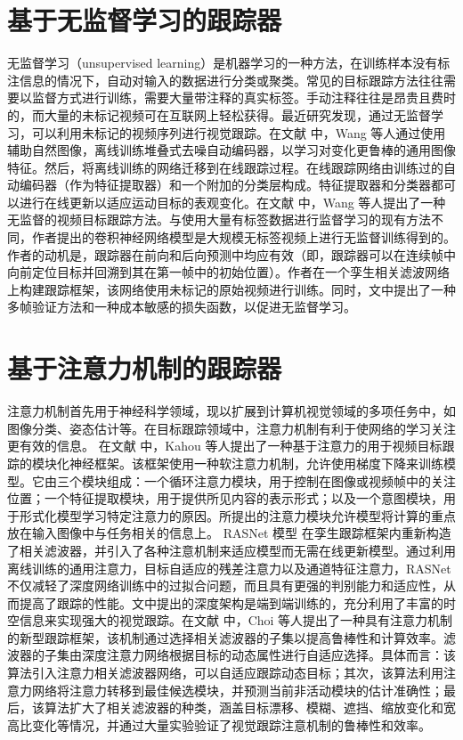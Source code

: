 \section{基于无监督学习的跟踪器}
无监督学习（unsupervised learning）是机器学习的一种方法，在训练样本没有标注信息的情况下，自动对输入的数据进行分类或聚类。常见的目标跟踪方法往往需要以监督方式进行训练，需要大量带注释的真实标签。手动注释往往是昂贵且费时的，而大量的未标记视频可在互联网上轻松获得。最近研究发现，通过无监督学习，可以利用未标记的视频序列进行视觉跟踪。在文献 \cite{wang2013learning} 中，Wang 等人通过使用辅助自然图像，离线训练堆叠式去噪自动编码器，以学习对变化更鲁棒的通用图像特征。然后，将离线训练的网络迁移到在线跟踪过程。在线跟踪网络由训练过的自动编码器（作为特征提取器）和一个附加的分类层构成。特征提取器和分类器都可以进行在线更新以适应运动目标的表观变化。在文献 \cite{wang2019unsupervised} 中，Wang 等人提出了一种无监督的视频目标跟踪方法。与使用大量有标签数据进行监督学习的现有方法不同，作者提出的卷积神经网络模型是大规模无标签视频上进行无监督训练得到的。作者的动机是，跟踪器在前向和后向预测中均应有效（即，跟踪器可以在连续帧中向前定位目标并回溯到其在第一帧中的初始位置）。作者在一个孪生相关滤波网络上构建跟踪框架，该网络使用未标记的原始视频进行训练。同时，文中提出了一种多帧验证方法和一种成本敏感的损失函数，以促进无监督学习。
\section{基于注意力机制的跟踪器}
注意力机制首先用于神经科学领域，现以扩展到计算机视觉领域的多项任务中，如图像分类、姿态估计等。在目标跟踪领域中，注意力机制有利于使网络的学习关注更有效的信息。
在文献 \cite{RATM} 中，Kahou 等人提出了一种基于注意力的用于视频目标跟踪的模块化神经框架。该框架使用一种软注意力机制，允许使用梯度下降来训练模型。它由三个模块组成：一个循环注意力模块，用于控制在图像或视频帧中的关注位置；一个特征提取模块，用于提供所见内容的表示形式；以及一个意图模块，用于形式化模型学习特定注意力的原因。所提出的注意力模块允许模型将计算的重点放在输入图像中与任务相关的信息上。%
RASNet 模型 \cite{wang2018learning} 在孪生跟踪框架内重新构造了相关滤波器，并引入了各种注意机制来适应模型而无需在线更新模型。通过利用离线训练的通用注意力，目标自适应的残差注意力以及通道特征注意力，RASNet 不仅减轻了深度网络训练中的过拟合问题，而且具有更强的判别能力和适应性，从而提高了跟踪的性能。文中提出的深度架构是端到端训练的，充分利用了丰富的时空信息来实现强大的视觉跟踪。在文献 \cite{choi2017attentional} 中，Choi 等人提出了一种具有注意力机制的新型跟踪框架，该机制通过选择相关滤波器的子集以提高鲁棒性和计算效率。滤波器的子集由深度注意力网络根据目标的动态属性进行自适应选择。具体而言：该算法引入注意力相关滤波器网络，可以自适应跟踪动态目标；其次，该算法利用注意力网络将注意力转移到最佳候选模块，并预测当前非活动模块的估计准确性；最后，该算法扩大了相关滤波器的种类，涵盖目标漂移、模糊、遮挡、缩放变化和宽高比变化等情况，并通过大量实验验证了视觉跟踪注意机制的鲁棒性和效率。
